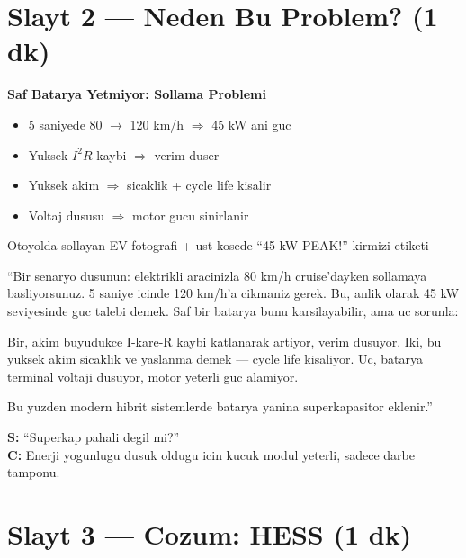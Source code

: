 \documentclass[11pt,a4paper]{article}
\begin{document}
\section{Slayt 2 --- Neden Bu Problem? (1 dk)}

\begin{slytboks}
\textbf{Saf Batarya Yetmiyor: Sollama Problemi}
\begin{itemize}
\item 5 saniyede 80 $\to$ 120 km/h $\Rightarrow$ 45 kW ani guc
\item Yuksek $I^2 R$ kaybi $\Rightarrow$ verim duser
\item Yuksek akim $\Rightarrow$ sicaklik + cycle life kisalir
\item Voltaj dususu $\Rightarrow$ motor gucu sinirlanir
\end{itemize}
\end{slytboks}

\begin{gorselboks}
Otoyolda sollayan EV fotografi + ust kosede ``45 kW PEAK!'' kirmizi etiketi
\end{gorselboks}

\begin{sayboks}
``Bir senaryo dusunun: elektrikli aracinizla 80 km/h cruise'dayken sollamaya basliyorsunuz. 5 saniye icinde 120 km/h'a cikmaniz gerek. Bu, anlik olarak 45 kW seviyesinde guc talebi demek. Saf bir batarya bunu karsilayabilir, ama uc sorunla:

Bir, akim buyudukce I-kare-R kaybi katlanarak artiyor, verim dusuyor. Iki, bu yuksek akim sicaklik ve yaslanma demek --- cycle life kisaliyor. Uc, batarya terminal voltaji dusuyor, motor yeterli guc alamiyor.

Bu yuzden modern hibrit sistemlerde batarya yanina superkapasitor eklenir.''
\end{sayboks}

\begin{soruboks}
\textbf{S:} ``Superkap pahali degil mi?''\\
\textbf{C:} Enerji yogunlugu dusuk oldugu icin kucuk modul yeterli, sadece darbe tamponu.
\end{soruboks}

\section{Slayt 3 --- Cozum: HESS (1 dk)}
\end{document}
